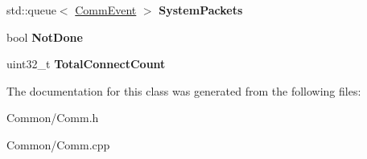 \begin{DoxyCompactItemize}
\item 
\hypertarget{classbali_1_1_comm_a98417b951cfe5f886e47fd1f75a27528}{std\-::queue$<$ \hyperlink{classbali_1_1_comm_event}{Comm\-Event} $>$ {\bfseries System\-Packets}}\label{classbali_1_1_comm_a98417b951cfe5f886e47fd1f75a27528}

\item 
\hypertarget{classbali_1_1_comm_ab8e13d6b2c3fec0313f18a9e0e83d234}{bool {\bfseries Not\-Done}}\label{classbali_1_1_comm_ab8e13d6b2c3fec0313f18a9e0e83d234}

\item 
\hypertarget{classbali_1_1_comm_a95fa80b87795af147746fb9152b443de}{uint32\-\_\-t {\bfseries Total\-Connect\-Count}}\label{classbali_1_1_comm_a95fa80b87795af147746fb9152b443de}

\end{DoxyCompactItemize}


The documentation for this class was generated from the following files\-:\begin{DoxyCompactItemize}
\item 
Common/Comm.\-h\item 
Common/Comm.\-cpp\end{DoxyCompactItemize}
